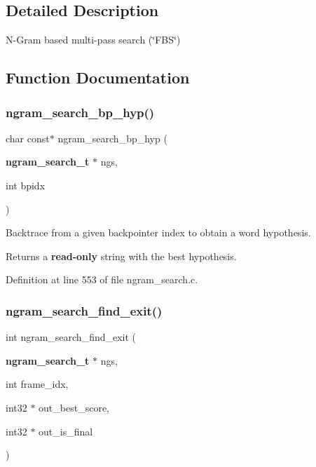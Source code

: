 \subsection{Detailed Description}
N-\/\+Gram based multi-\/pass search (\char`\"{}\+F\+B\+S\char`\"{}) 



\subsection{Function Documentation}
\mbox{\label{ngram__search_8c_aee393a136f8f7e8b98161e6eed7b1dd9}} 
\subsubsection{ngram\+\_\+search\+\_\+bp\+\_\+hyp()}
{\footnotesize\ttfamily char const$\ast$ ngram\+\_\+search\+\_\+bp\+\_\+hyp (\begin{DoxyParamCaption}\item[{\textbf{ ngram\+\_\+search\+\_\+t} $\ast$}]{ngs,  }\item[{int}]{bpidx }\end{DoxyParamCaption})}



Backtrace from a given backpointer index to obtain a word hypothesis. 

\begin{DoxyReturn}{Returns}
a {\bfseries read-\/only} string with the best hypothesis. 
\end{DoxyReturn}


Definition at line 553 of file ngram\+\_\+search.\+c.

\mbox{\label{ngram__search_8c_ac6a01bb08e7b8d1deb39763a98148cb0}} 
\subsubsection{ngram\+\_\+search\+\_\+find\+\_\+exit()}
{\footnotesize\ttfamily int ngram\+\_\+search\+\_\+find\+\_\+exit (\begin{DoxyParamCaption}\item[{\textbf{ ngram\+\_\+search\+\_\+t} $\ast$}]{ngs,  }\item[{int}]{frame\+\_\+idx,  }\item[{int32 $\ast$}]{out\+\_\+best\+\_\+score,  }\item[{int32 $\ast$}]{out\+\_\+is\+\_\+final }\end{DoxyParamCaption})}



